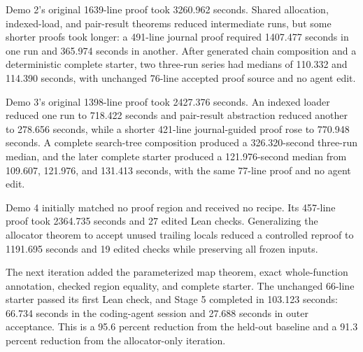 \documentclass[11pt]{article}
\begin{document}
Demo 2's original 1639-line proof took 3260.962 seconds.  Shared allocation, indexed-load, and pair-result theorems reduced intermediate runs, but some shorter proofs took longer: a 491-line journal proof required 1407.477 seconds in one run and 365.974 seconds in another.  After generated chain composition and a deterministic complete starter, two three-run series had medians of 110.332 and 114.390 seconds, with unchanged 76-line accepted proof source and no agent edit.

Demo 3's original 1398-line proof took 2427.376 seconds.  An indexed loader reduced one run to 718.422 seconds and pair-result abstraction reduced another to 278.656 seconds, while a shorter 421-line journal-guided proof rose to 770.948 seconds.  A complete search-tree composition produced a 326.320-second three-run median, and the later complete starter produced a 121.976-second median from 109.607, 121.976, and 131.413 seconds, with the same 77-line proof and no agent edit.

Demo 4 initially matched no proof region and received no recipe.  Its 457-line proof took 2364.735 seconds and 27 edited Lean checks.  Generalizing the allocator theorem to accept unused trailing locals reduced a controlled reproof to 1191.695 seconds and 19 edited checks while preserving all frozen inputs.

The next iteration added the parameterized map theorem, exact whole-function annotation, checked region equality, and complete starter.  The unchanged 66-line starter passed its first Lean check, and Stage 5 completed in 103.123 seconds: 66.734 seconds in the coding-agent session and 27.688 seconds in outer acceptance.  This is a 95.6 percent reduction from the held-out baseline and a 91.3 percent reduction from the allocator-only iteration.
\end{document}
